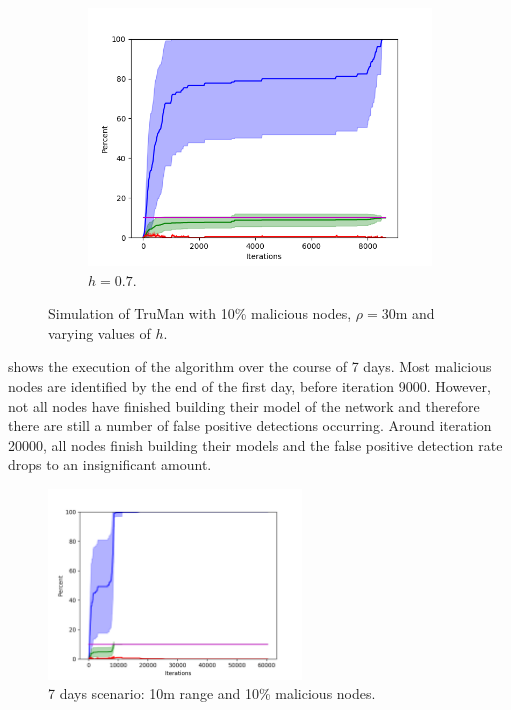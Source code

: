 \begin{figure}
\centering
\begin{subfigure}{0.5\textwidth}
\includegraphics[width=\linewidth]{images/plots/thresholds/07_30_10}
\caption{$h = 0.7$.} \label{fig:threshold07}
\end{subfigure}

\caption{Simulation of TruMan with 10\% malicious nodes, $\rho = 30$m and varying values of $h$.}
\label{fig:randomthresholds}
\end{figure}

 shows the execution of the algorithm over the course of 7 days.
Most malicious nodes are identified by the end of the first day, before iteration 9000.
However, not all nodes have finished building their model of the network and therefore there are still a number of false positive detections occurring.
Around iteration 20000, all nodes finish building their models and the false positive detection rate drops to an insignificant amount.

\begin{figure}
\centering
\includegraphics[width=0.6\textwidth]{images/plots/Network_rA7/10_10}
\caption{7 days scenario: 10m range and 10\% malicious nodes.} \label{fig:random7}
\end{figure}

